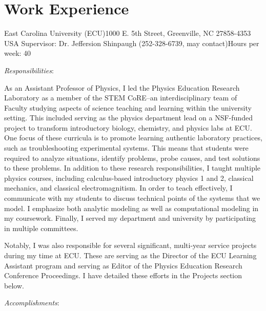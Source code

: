 \section{Work Experience}
\resumeSubHeadingListStart

 {East Carolina
  University (ECU)}{1000 E. 5th Street, Greenville, NC 27858-4353 USA } {Supervisor:
  Dr. Jeffersion Shinpaugh (252-328-6739, may contact)}{Hours per week: 40}

\vspace{1em}
\textit{Responsibilities}:

As an Assistant Professor of Physics, I led the Physics Education Research Laboratory as a
member of the STEM CoRE--an interdisciplinary team of Faculty studying aspects of science
teaching and learning within the university setting. This included serving as the physics
department lead on a NSF-funded project to transform introductory biology, chemistry, and
physics labs at ECU. One focus of these curricula is to promote learning authentic laboratory
practices, such as troubleshooting experimental systems. This means that students were required
to analyze situations, identify problems, probe causes, and test solutions to these problems.
In addition to these research responsibilities, I taught multiple physics courses, including
calculus-based introductory physics 1 and 2, classical mechanics, and classical
electromagnitism. In order to teach effectively, I communicate with my students to discuss
technical points of the systems that we model. I emphasize both analytic modeling as well as
computational modeling in my coursework. Finally, I served my department and university by
participating in multiple committees.

Notably, I was also responsible for several significant, multi-year service projects during my
time at ECU. These are serving as the Director of the ECU Learning Assistant program and
serving as Editor of the Physics Education Research Conference Proceedings. I have detailed
these efforts in the Projects section below.
  
\textit{Accomplishments}:

\resumeItemListStart



